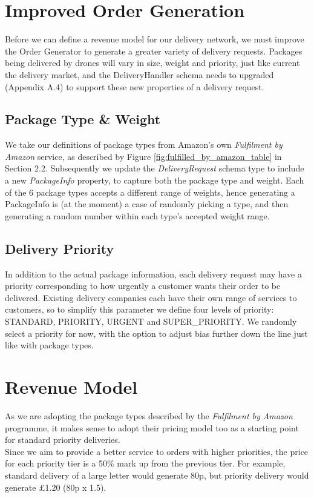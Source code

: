 \documentclass[a4paper,11pt,titlepage]{report}
\begin{document}
\section{Improved Order Generation}
Before we can define a revenue model for our delivery network, we must improve the Order Generator to generate a greater variety of delivery requests. Packages being delivered by drones will vary in size, weight and priority, just like current the delivery market, and the DeliveryHandler schema needs to upgraded (Appendix A.4) to support these new properties of a delivery request.

\subsection{Package Type \& Weight}
We take our definitions of package types from Amazon's own \textit{Fulfilment by Amazon} service, as described by Figure \ref{fig:fulfilled_by_amazon_table} in Section 2.2. Subsequently we update the \textit{DeliveryRequest} schema type to include a new \textit{PackageInfo} property, to capture both the package type and weight. Each of the 6 package types accepts a different range of weights, hence generating a PackageInfo is (at the moment) a case of randomly picking a type, and then generating a random number within each type's accepted weight range.

\subsection{Delivery Priority}
In addition to the actual package information, each delivery request may have a priority corresponding to how urgently a customer wants their order to be delivered. Existing delivery companies each have their own range of services to customers, so to simplify this parameter we define four levels of priority: STANDARD, PRIORITY, URGENT and SUPER\_PRIORITY. We randomly select a priority for now, with the option to adjust bias further down the line just like with package types.

\section{Revenue Model}
As we are adopting the package types described by the \textit{Fulfilment by Amazon} programme, it makes sense to adopt their pricing model too as a starting point for standard priority deliveries.\\

Since we aim to provide a better service to orders with higher priorities, the price for each priority tier is a 50\% mark up from the previous tier. For example, standard delivery of a large letter would generate 80p, but priority delivery would generate £1.20 (80p x 1.5).\\
\end{document}
